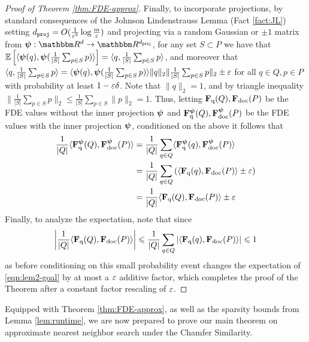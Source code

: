 \begin{proof}[Proof of Theorem \ref{thm:FDE-approx}]
Finally, to incorporate projections, by standard consequences of the Johnson Lindenstrauss Lemma (Fact \ref{fact:JL}) setting $d_{\texttt{proj}} = O(\frac{1}{\varepsilon^2} \log\frac{m}{\varepsilon})$ and projecting via a random Gaussian or $\pm 1$ matrix from $\bpsi: \R^d \to \R^{\dproj}$, for any set $S \subset P$ we have that  $ \mathop{ \mathbb{E}\left[ \langle \boldsymbol{\psi}(q), \boldsymbol{\psi}(\frac{1}{|S|} \sum_{p \in S} p ) \rangle  \right]} = \langle q,\frac{1}{|S|} \sum_{p \in S} p  \rangle$, and moreover that  $\langle q,\frac{1}{|S|} \sum_{p \in S} p  \rangle = \langle \boldsymbol{\psi}(q), \boldsymbol{\psi}(\frac{1}{|S|} \sum_{p \in S} p ) \rangle \|q\|_2\|\frac{1}{|S|} \sum_{p \in S} p \|_2\pm \varepsilon$ for all $q \in Q,p \in P$ with probability at least $1-\varepsilon \delta$. Note that $\|q\|_2 = 1$, and by triangle inequality $\|\frac{1}{|S|} \sum_{p \in S} p \|_2 \leq \frac{1}{|S|} \sum_{p \in S} \| p \|_2 = 1$. Thus, letting $\mathbf{F}_{\text{q}}(Q) , \mathbf{F}_{\text{doc}}(P)$ be the FDE values without the inner projection $\boldsymbol{\psi}$ and $\mathbf{F}_{\text{q}}^{\boldsymbol{\psi}}(Q) , \mathbf{F}_{\text{doc}}^{\boldsymbol{\psi}}(P)$ be the FDE values with the inner projection $\boldsymbol{\psi}$, conditioned on the above it follows that 
\begin{equation}
    \begin{split}
       \frac{1}{|Q|} \langle \mathbf{F}_{\text{q}}^{\boldsymbol{\psi}}(Q) , \mathbf{F}_{\text{doc}}^{\boldsymbol{\psi}}(P) \rangle & =     \frac{1}{|Q|}\sum_{q \in Q}  \langle \mathbf{F}_{\text{q}}^{\boldsymbol{\psi}}(q) , \mathbf{F}_{\text{doc}}^{\boldsymbol{\psi}}(P) \rangle \\
       &= \frac{1}{|Q|}\sum_{q \in Q} \left( \langle \mathbf{F}_{\text{q}}(q) , \mathbf{F}_{\text{doc}}(P) \rangle \pm \varepsilon\right)\\
           &= \frac{1}{|Q|} \langle \mathbf{F}_{\text{q}}(Q) , \mathbf{F}_{\text{doc}}(P)   \rangle \pm \varepsilon
    \end{split}
\end{equation}
Finally, to analyze the expectation, note that since
\[\left|\frac{1}{|Q|}\langle \mathbf{F}_{\text{q}}(Q) , \mathbf{F}_{\text{doc}}(P) \rangle\right| \leqslant \frac{1}{|Q|}\sum_{q \in Q} \left|\langle \mathbf{F}_{\text{q}}(q) , \mathbf{F}_{\text{doc}}(P) \rangle \right| \leqslant 1\]
as before conditioning on this small probability event changes the expectation of \ref{eqn:lem2-goal} by at most a $\varepsilon$ additive factor,  which completes the proof of the Theorem after a constant factor rescaling of $\varepsilon$. 
 
\end{proof}

Equipped with Theorem \ref{thm:FDE-approx}, as well as the sparsity bounds from Lemma \ref{lem:runtime}, we are now prepared to prove our main theorem on approximate nearest neighbor search under the Chamfer Similarity. 

